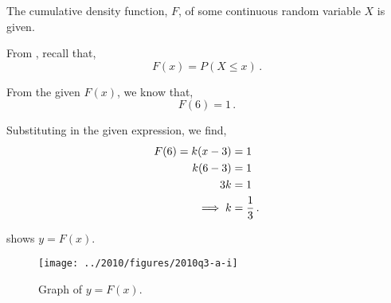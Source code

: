 %
%


\begin{subquestions}
	
\subquestion

The cumulative density function, $F$, of some continuous random variable $X$ is given.

\begin{subsubquestions}
	
\subsubquestion

From , recall that,
\begin{equation}
	F(x) = P(X \leq x) \,.
\end{equation}
	
From the given $F(x)$, we know that,
\begin{equation}
	F(6) = 1 \,.
\end{equation}

Substituting in the given expression, we find,
\begin{align}
	F(6) = k(x-3) & = 1 \nonumber \\
	       k(6-3) & = 1 \nonumber \\
	       3k & = 1 \nonumber \\
	       \implies k & = \frac{1}{3} \,.
\end{align}

 shows $y=F(x)$.
\begin{figure}[H]
	\begin{center}
		\texttt{[image: ../2010/figures/2010q3-a-i]}
		\caption{\label{2010:q3:fig:FGraph} Graph of $y=F(x)$.}
	\end{center}
\end{figure}


\subsubquestion


\end{subsubquestions}
\end{subquestions}
